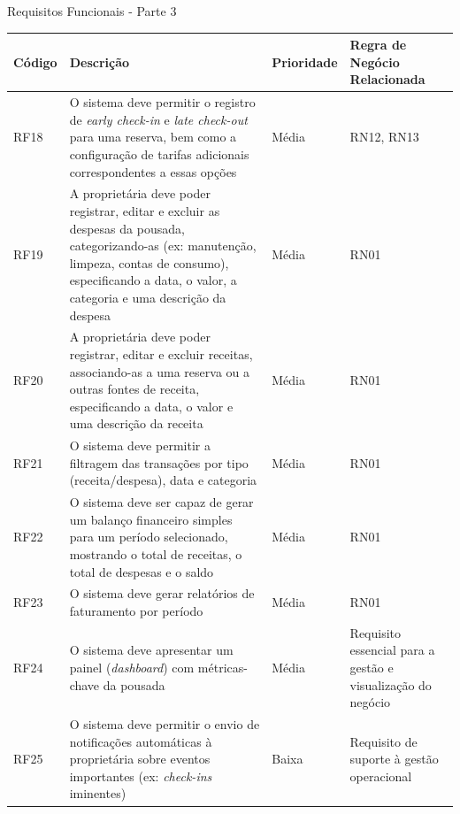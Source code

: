 \documentclass[
	12pt,				%
	openany,			%
	oneside,			%
	a4paper,			%
	english,			%
	french,				%
	spanish,			%
	brazil				%
	]{abntex2}
\begin{document}
\begin{quadro}[H]
	\caption{Requisitos Funcionais - Parte 3}
	\label{quadro_rf3}
	\begin{tabular}{|>{\centering\arraybackslash}p{1.5cm}|p{6.7cm}|>{\centering\arraybackslash}p{2cm}|>{\centering\arraybackslash}p{4cm}|}
		\hline
		\textbf{Código} & \textbf{Descrição} & \textbf{Prioridade} & \textbf{Regra de Negócio Relacionada} \\ \hline
		RF18 & O sistema deve permitir o registro de \textit{early check-in} e \textit{late check-out} para uma reserva, bem como a configuração de tarifas adicionais correspondentes a essas opções & Média & RN12, RN13  \\ \hline
		RF19 & A proprietária deve poder registrar, editar e excluir as despesas da pousada, categorizando-as (ex: manutenção, limpeza, contas de consumo), especificando a data, o valor, a categoria e uma descrição da despesa & Média & RN01 
		\\ \hline
		RF20 & A proprietária deve poder registrar, editar e excluir receitas, associando-as a uma reserva ou a outras fontes de receita, especificando a data, o valor e uma descrição da receita & Média & RN01 \\ \hline
		RF21 & O sistema deve permitir a filtragem das transações por tipo (receita/despesa), data e categoria & Média & RN01 \\ \hline
		RF22 & O sistema deve ser capaz de gerar um balanço financeiro simples para um período selecionado, mostrando o total de receitas, o total de despesas e o saldo & Média & RN01 \\ \hline
		RF23 & O sistema deve gerar relatórios de faturamento por período & Média & RN01 \\ \hline
		RF24 & O sistema deve apresentar um painel (\textit{dashboard}) com métricas-chave da pousada & Média & Requisito essencial para a gestão e visualização do negócio \\ \hline
		RF25 & O sistema deve permitir o envio de notificações automáticas à proprietária sobre eventos importantes (ex: \textit{check-ins} iminentes)
		& Baixa & Requisito de suporte à gestão operacional \\ \hline
	\end{tabular}
\end{quadro}
%
\end{document}
